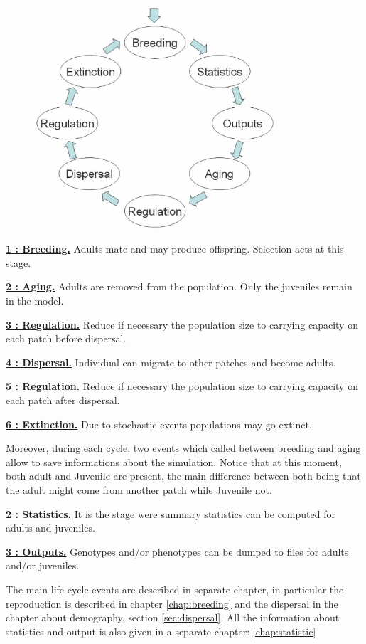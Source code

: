 \documentclass[letterpaper,12pt,oneside]{book}
\begin{document}
\begin{figure}[h]
	\centering
		\includegraphics[width=0.80\textwidth]{life-cycle.pdf}
	\label{fig:life-cycle}
\end{figure}
\begin{description}
\item \textbf{\hyperref[chap:breeding]{1 : Breeding.}} Adults mate and may produce offspring. Selection acts at this stage.
\item \textbf{\hyperref[4aging]{2 : Aging.}} Adults are removed from the population. Only the juveniles remain in the model.
\item \textbf{\hyperref[5regulation]{3 : Regulation.}} Reduce if necessary the population size to carrying capacity on each patch before dispersal. 
\item \textbf{\hyperref[sec:dispersal]{4 : Dispersal.}} Individual can migrate to other patches and become adults. 
\item \textbf{\hyperref[7regulation]{5 : Regulation.}} Reduce if necessary the population size to carrying capacity on each patch after dispersal. 
\item \textbf{\hyperref[8extinction]{6 : Extinction.}} Due to stochastic events populations may go extinct.
\end{description}
Moreover, during each cycle,  two events which called between breeding and aging allow to save informations about the simulation.  Notice that at this moment, both adult and Juvenile are present, the main difference between both being that the adult might come from another patch while Juvenile not. 
\begin{description}
\item \textbf{\hyperref[2statistics]{2 : Statistics.}} It is the stage were summary statistics can be computed for adults and juveniles.
\item \textbf{\hyperref[3output]{3 : Outputs.}} Genotypes and/or phenotypes can be dumped to files for adults and/or juveniles.
\end{description}
The main life cycle events are described in separate chapter, in particular the reproduction is described in chapter \ref{chap:breeding} and the dispersal in the chapter about demography, section \ref{sec:dispersal}. All the information about statistics and output is also given in a separate chapter: \ref{chap:statistic}
\end{document}
